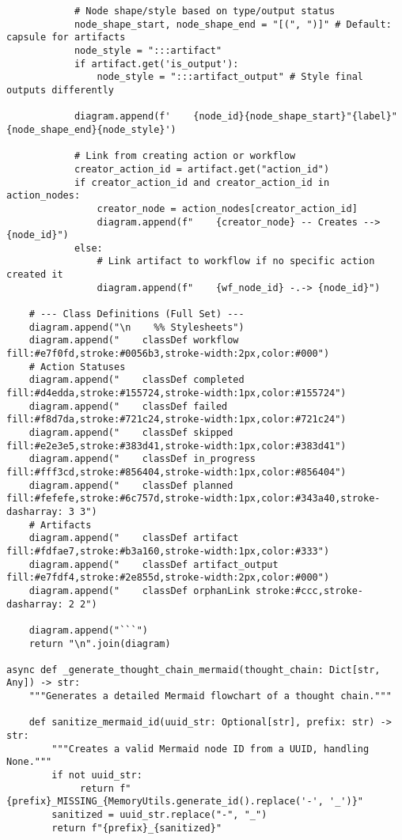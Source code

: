 \documentclass[12pt,a4paper]{article}
\begin{document}
\begin{pageablecode}
\begin{verbatim}
            # Node shape/style based on type/output status
            node_shape_start, node_shape_end = "[(", ")]" # Default: capsule for artifacts
            node_style = ":::artifact"
            if artifact.get('is_output'):
                node_style = ":::artifact_output" # Style final outputs differently

            diagram.append(f'    {node_id}{node_shape_start}"{label}"{node_shape_end}{node_style}')

            # Link from creating action or workflow
            creator_action_id = artifact.get("action_id")
            if creator_action_id and creator_action_id in action_nodes:
                creator_node = action_nodes[creator_action_id]
                diagram.append(f"    {creator_node} -- Creates --> {node_id}")
            else:
                # Link artifact to workflow if no specific action created it
                diagram.append(f"    {wf_node_id} -.-> {node_id}")

    # --- Class Definitions (Full Set) ---
    diagram.append("\n    %% Stylesheets")
    diagram.append("    classDef workflow fill:#e7f0fd,stroke:#0056b3,stroke-width:2px,color:#000")
    # Action Statuses
    diagram.append("    classDef completed fill:#d4edda,stroke:#155724,stroke-width:1px,color:#155724")
    diagram.append("    classDef failed fill:#f8d7da,stroke:#721c24,stroke-width:1px,color:#721c24")
    diagram.append("    classDef skipped fill:#e2e3e5,stroke:#383d41,stroke-width:1px,color:#383d41")
    diagram.append("    classDef in_progress fill:#fff3cd,stroke:#856404,stroke-width:1px,color:#856404")
    diagram.append("    classDef planned fill:#fefefe,stroke:#6c757d,stroke-width:1px,color:#343a40,stroke-dasharray: 3 3")
    # Artifacts
    diagram.append("    classDef artifact fill:#fdfae7,stroke:#b3a160,stroke-width:1px,color:#333")
    diagram.append("    classDef artifact_output fill:#e7fdf4,stroke:#2e855d,stroke-width:2px,color:#000")
    diagram.append("    classDef orphanLink stroke:#ccc,stroke-dasharray: 2 2")

    diagram.append("```")
    return "\n".join(diagram)

async def _generate_thought_chain_mermaid(thought_chain: Dict[str, Any]) -> str:
    """Generates a detailed Mermaid flowchart of a thought chain."""

    def sanitize_mermaid_id(uuid_str: Optional[str], prefix: str) -> str:
        """Creates a valid Mermaid node ID from a UUID, handling None."""
        if not uuid_str:
             return f"{prefix}_MISSING_{MemoryUtils.generate_id().replace('-', '_')}"
        sanitized = uuid_str.replace("-", "_")
        return f"{prefix}_{sanitized}"


\end{verbatim}
\end{pageablecode}
\end{document}
